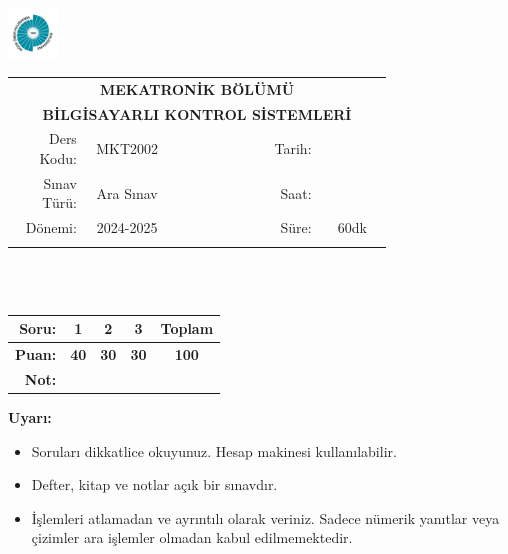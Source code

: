 \newcommand\UniversiteAdi{Niğde Ömer Halisdemir Üniversitesi}
\newcommand\BolumAdi{MEKATRONİK BÖLÜMÜ}
\newcommand\DersKodu{MKT2002}
\newcommand\DersAdi{BİLGİSAYARLI KONTROL SİSTEMLERİ}
\newcommand\SinavAdi{Ara Sınav}
\newcommand\SinavTarihi{ }
\newcommand\SinavSaati{ }
\newcommand\SinavSuresi{60dk}

\pagestyle{fancy}
\fancyhf{} %
\noindent \includegraphics[width=0.1\textwidth]{logo}
\begin{tabular}{
    p{0.15\linewidth}
    p{0.15\linewidth}
    p{0.2\linewidth}
    p{0.1\linewidth}
    p{0.15\linewidth}}
    \multicolumn{5}{c}{\textbf{\BolumAdi}}\\
    \multicolumn{5}{c}{\textbf{\DersAdi}}\\\hline
    \multicolumn{1}{|r|}{Ders Kodu:}&
    \multicolumn{1}{|c|}{\DersKodu}&
    \multicolumn{1}{|c|}{}& 
    \multicolumn{1}{|r|}{Tarih:}&
    \multicolumn{1}{|c|}{\SinavTarihi} \\\hline
    \multicolumn{1}{|r|}{Sınav Türü:}&
    \multicolumn{1}{|c|}{\SinavAdi}&  
    \multicolumn{1}{|c|}{}&
    \multicolumn{1}{|r|}{Saat:}&
    \multicolumn{1}{|c|}{\SinavSaati}\\\hline
    \multicolumn{1}{|r|}{Dönemi:}&
    \multicolumn{1}{|c|}{2024-2025}&
    \multicolumn{1}{|c|}{}&
    \multicolumn{1}{|r|}{Süre:}&
    \multicolumn{1}{|c|}{\SinavSuresi} \\\hline
    &&&&\\
\end{tabular}\\\\
\noindent\begin{center}
\begin{tabular}{|r|c|c|c|c|}\hline
    \textbf{Soru:}&
    \textbf{1}&
    \textbf{2}&
    \textbf{3}&
    \textbf{Toplam}\\\hline
    \textbf{Puan:}&
    \textbf{40}&
    \textbf{30}&
    \textbf{30}&
    \textbf{100}\\\hline
    \textbf{Not:}&&&&\\\hline
\end{tabular}\end{center}
\noindent\textbf{Uyarı:}
\begin{itemize}\bfseries
    \item Soruları dikkatlice okuyunuz. Hesap makinesi kullanılabilir.
    \item Defter, kitap ve notlar açık bir sınavdır.
    \item İşlemleri atlamadan ve ayrıntılı olarak veriniz. Sadece nümerik yanıtlar veya çizimler ara işlemler olmadan kabul edilmemektedir.
\end{itemize}

